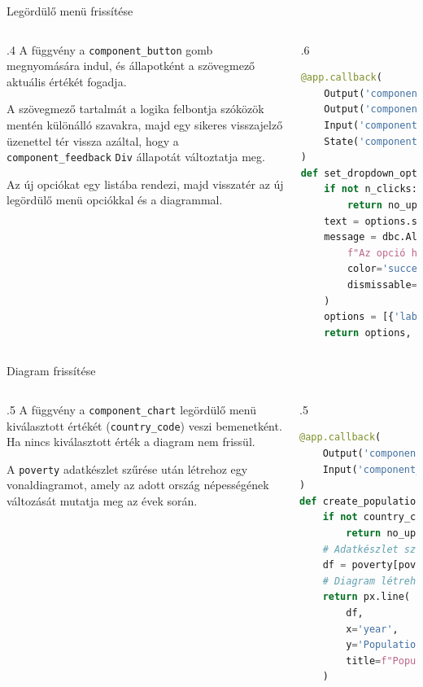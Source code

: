 \documentclass[english, aspectratio=169]{beamer}
\begin{document}
	\begin{frame}[fragile]{Legördülő menü frissítése}
		\begin{columns}
			\begin{column}{.4\textwidth}
				A függvény a \texttt{component\_button} gomb megnyomására indul, és állapotként a szövegmező aktuális értékét fogadja.\par\smallskip
				A szövegmező tartalmát a logika felbontja szóközök mentén különálló szavakra, majd egy sikeres visszajelző üzenettel tér vissza azáltal, hogy a \texttt{component\_feedback} \texttt{Div} állapotát változtatja meg.\par\smallskip
				Az új opciókat egy listába rendezi, majd visszatér az új legördülő menü opciókkal és a diagrammal. 
			\end{column}
			\begin{column}{.6\textwidth}
				\begin{lstlisting}[language=python]
@app.callback(
	Output('component_dropdown', 'options'),
	Output('component_feedback', 'children'),
	Input('component_button', 'n_clicks'),
	State('component_text', 'value')
)
def set_dropdown_options(n_clicks, options):
	if not n_clicks:
		return no_update
	text = options.split()
	message = dbc.Alert(
		f"Az opció hozzáadása sikeresen megtörtént: {','.join(text)}",
		color='success',
		dismissable=True
	)
	options = [{'label': t, 'value': t} for t in text]
	return options, message
				\end{lstlisting}
			\end{column}
		\end{columns}
	\end{frame}
	
	\begin{frame}[fragile]{Diagram frissítése}
		\begin{columns}
			\begin{column}{.5\textwidth}
				A függvény a \texttt{component\_chart}  legördülő menü kiválasztott értékét (\texttt{country\_code}) veszi bemenetként. Ha nincs kiválasztott érték a diagram nem frissül.\par\smallskip
				A \texttt{poverty} adatkészlet szűrése után létrehoz egy vonaldiagramot, amely az adott ország népességének változását mutatja meg az évek során.
			\end{column}
			\begin{column}{.5\textwidth}
				\begin{lstlisting}[language=python]
@app.callback(
	Output('component_chart', 'figure'),
	Input('component_dropdown', 'value')
)
def create_population_chart(country_code):
	if not country_code:
		return no_update
	# Adatkészlet szűrése
	df = poverty[poverty['Country Code'] == country_code]
	# Diagram létrehozása
	return px.line(
		df,
		x='year',
		y='Population, total',
		title=f"Population of {country_code}"
	)
				\end{lstlisting}
			\end{column}
		\end{columns}
	\end{frame}
	
\end{document}
